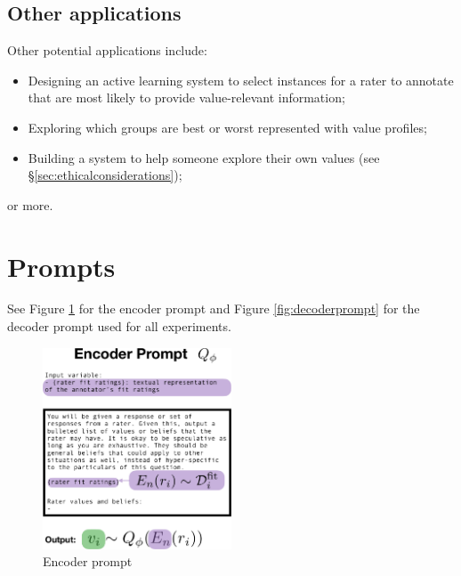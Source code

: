 \documentclass[11pt]{article}
\begin{document}
\subsection{Other applications}

Other potential applications include:
\begin{itemize}
\item Designing an active learning system to select instances for a rater to annotate that are most likely to provide value-relevant information;
\item Exploring which groups are best or worst represented with value profiles;
\item Building a system to help someone explore their own values (see \S\ref{sec:ethicalconsiderations});
\end{itemize}
or more.

\section{Prompts}
\label{app:prompts}

See Figure \ref{fig:encoderprompt} for the encoder prompt and Figure \ref{fig:decoderprompt} for the decoder prompt used for all experiments.

\begin{figure}[t]
\centering
\includegraphics[width=0.5\textwidth]{files/encoder_prompt_cropped.pdf}
\caption{Encoder prompt}
\label{fig:encoderprompt}
\end{figure}
\end{document}
